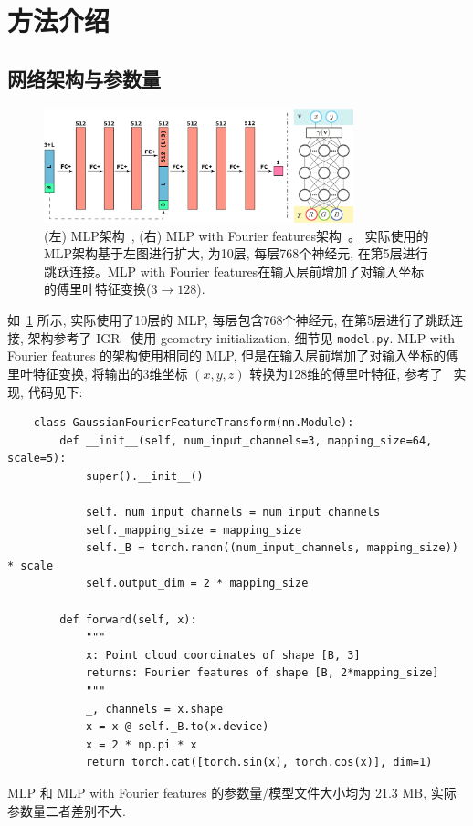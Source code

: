 \documentclass[11pt]{article}
\newcommand\1{\mathds{1}}
\begin{document}
\section{方法介绍}
\subsection{网络架构与参数量}
\begin{figure}[htbp]
    \centering
    \includegraphics[width=0.8\textwidth]{imgs/arch.pdf}
    \caption{(左) MLP架构~\cite{gropp2020implicitgeometricregularizationlearning}, (右) MLP with Fourier features架构~\cite{tancik2020fourierfeaturesletnetworks}。 实际使用的MLP架构基于左图进行扩大, 为10层, 每层768个神经元, 在第5层进行跳跃连接。MLP with Fourier features在输入层前增加了对输入坐标的傅里叶特征变换($3\to 128$). }
    \label{fig:arch}
\end{figure}
如~\cref{fig:arch} 所示, 实际使用了10层的 MLP, 每层包含768个神经元, 在第5层进行了跳跃连接, 架构参考了 IGR~\cite{gropp2020implicitgeometricregularizationlearning} 使用 geometry initialization, 细节见 \texttt{model.py}.
MLP with Fourier features 的架构使用相同的 MLP, 但是在输入层前增加了对输入坐标的傅里叶特征变换, 将输出的3维坐标 $(x,y,z)$ 转换为128维的傅里叶特征, 参考了~\cite{tancik2020fourierfeaturesletnetworks} 实现, 代码见下:
\begin{verbatim}
    class GaussianFourierFeatureTransform(nn.Module):
        def __init__(self, num_input_channels=3, mapping_size=64, scale=5):
            super().__init__()

            self._num_input_channels = num_input_channels
            self._mapping_size = mapping_size
            self._B = torch.randn((num_input_channels, mapping_size)) * scale
            self.output_dim = 2 * mapping_size

        def forward(self, x):
            """
            x: Point cloud coordinates of shape [B, 3]
            returns: Fourier features of shape [B, 2*mapping_size]
            """
            _, channels = x.shape
            x = x @ self._B.to(x.device)
            x = 2 * np.pi * x
            return torch.cat([torch.sin(x), torch.cos(x)], dim=1)
\end{verbatim}
MLP 和 MLP with Fourier features 的参数量/模型文件大小均为 21.3 MB, 实际参数量二者差别不大.
\end{document}
